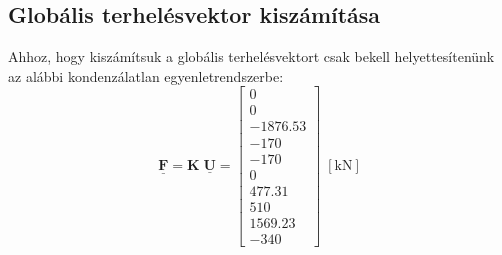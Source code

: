 \documentclass[12pt,a4paper]{article}
\def\mx#1{\mathbf{#1}}
\def\vec#1{\underline{\mathbf{#1}}}
\def\kN{\; \left[\mathrm{kN}\right]}
\begin{document}
\subsection{Globális terhelésvektor kiszámítása}
Ahhoz, hogy kiszámítsuk a globális terhelésvektort csak bekell helyettesítenünk
az alábbi kondenzálatlan egyenletrendszerbe:
\begin{equation}
    \vec{F}=\mx{K} \; \vec{U}=
    \begin{bmatrix}
        0        \\
        0        \\
        -1876.53 \\
        -170     \\
        -170     \\
        0        \\
        477.31   \\
        510      \\
        1569.23  \\
        -340
    \end{bmatrix} \kN
\end{equation}
\end{document}
